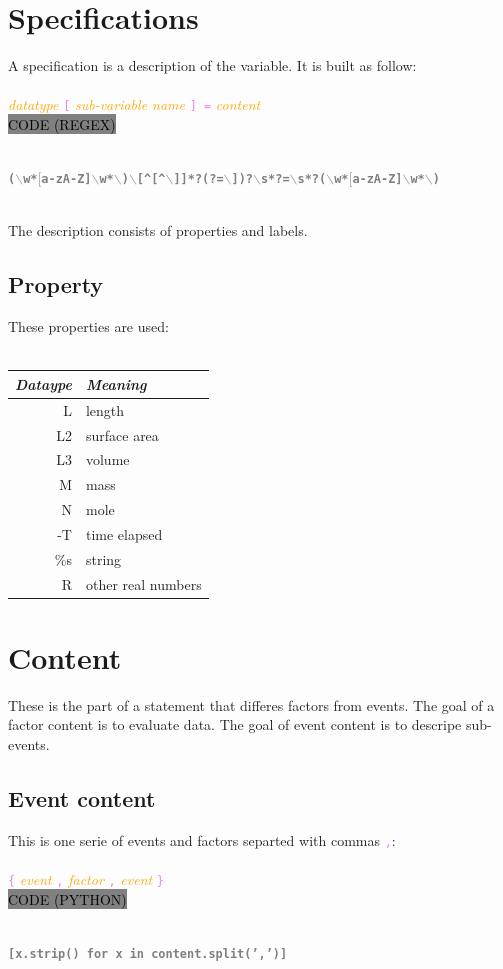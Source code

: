 \documentclass[15pt,a4paper,oneside]{article}
\newcommand{\regex}[1]{{\tiny\\\colorbox{grey}{\textcolor{black}{CODE (REGEX)}\hspace{0.87\textwidth}}}\vspace{-2.2em}\\\begin{framed}\bf{\textcolor{grey}{\vspace{-1.5em}\\\texttt{\small #1}}}\vspace{-0.33em}\end{framed}\vspace{-0.75em}}
\newcommand{\python}[1]{{\tiny\\\colorbox{grey}{\textcolor{black}{\tiny CODE (PYTHON)}\hspace{0.855\textwidth}}}\vspace{-2.2em}\\\begin{framed}\bf{\textcolor{grey}{\vspace{-1.5em}\\\texttt{\small #1}}}\vspace{-0.33em}\end{framed}\vspace{-0.75em}}
\newcommand{\code}[1]{{\textcolor{violet}{\texttt{\small #1}}}}
\newcommand{\comment}[1]{{\textcolor{orange}{\it #1}}}
\begin{document}
\section{Specifications}
A specification is a description of the variable. It is built as follow:\\\\
\comment{datatype} \code{[} \comment{sub-variable name} \code{] =} \comment{content}
\regex{($\backslash$w*$[$a-zA-Z]$\backslash$w*$\backslash$)$\backslash$[\textasciicircum[\textasciicircum$\backslash$]]*?(?=$\backslash$])?$\backslash$s*?=$\backslash$s*?($\backslash$w*$[$a-zA-Z]$\backslash$w*$\backslash$)}
\ 
\\
The description consists of properties and labels.
\subsection{Property}
These properties are used:\\\\
\begin{tabular}{r|l}
{\it Dataype} & {\it Meaning}\\
\hline L & length \\
\hline L2 & surface area \\
\hline L3 & volume \\
\hline M & mass \\
\hline N & mole \\
\hline -T & time elapsed\\
\hline \%s & string \\
\hline R & other real numbers\\
\end{tabular}
\section{Content}
These is the part of a statement that differes factors from events. The goal of a factor content is to evaluate data. The goal of event content is to descripe sub-events.
\newpage
\subsection{Event content}
This is one serie of events and factors separted with commas \code{,}:\\\\
\code{\{} \comment{event} \code{,} \comment{factor} \code{,} \comment{event} \code{\}}
\python{[x.strip() for x in content.split(',')]}
\end{document}
